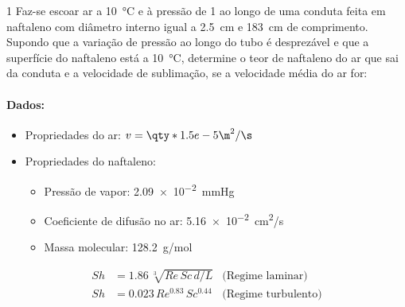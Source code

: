 \documentclass[\mainfilename]{subfiles}
\begin{document}
\begin{exampleBox}1{ %
    Faz-se escoar ar a \qty*{10}{\celsius} e à pressão de \qty*{1}{\atm} ao longo de uma conduta feita em naftaleno com diâmetro interno igual a \qty*{2.5}{\cm} e \qty*{183}{\cm} de comprimento. Supondo que a variação de pressão ao longo do tubo é desprezável e que a superfície do naftaleno está a \qty*{10}{\celsius}, determine o teor de naftaleno do ar que sai da conduta e a velocidade de sublimação, se a velocidade média do ar for:
} %
    \paragraph*{Dados:}
    \begin{itemize}
        \item Propriedades do ar: \(v=\qty*{1.5e-5}{\m^2/\s}\)
        \item Propriedades do naftaleno:
        \begin{itemize}
            \item Pressão de vapor: \qty*{2.09e-2}{\mmHg}
            \item Coeficiente de difusão no ar: \qty*{5.16e-2}{\cm^2/\s}
            \item Massa molecular: \qty*{128.2}{\g/\mole}
        \end{itemize}
    \end{itemize}
    \begin{align*}
        Sh&= 1.86\,\sqrt[3]{Re\,Sc\,d/L}
        &\text{(Regime laminar)}
        \\
        Sh&= 0.023\,Re^{0.83}\,Sc^{0.44}
        &\text{(Regime turbulento)}
    \end{align*}
\end{exampleBox}
\end{document}

